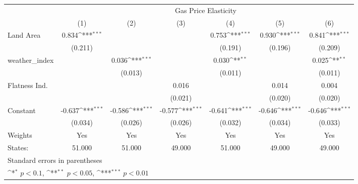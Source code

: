 {
\def\sym#1{\ifmmode^{#1}\else\(^{#1}\)\fi}
\begin{tabular}{l*{6}{c}}
\hline\hline
            &\multicolumn{6}{c}{Gas Price Elasticity}                                                                                           \\
            &\multicolumn{1}{c}{(1)}         &\multicolumn{1}{c}{(2)}         &\multicolumn{1}{c}{(3)}         &\multicolumn{1}{c}{(4)}         &\multicolumn{1}{c}{(5)}         &\multicolumn{1}{c}{(6)}         \\
\hline
Land Area   &       0.834\sym{***}&                     &                     &       0.753\sym{***}&       0.930\sym{***}&       0.841\sym{***}\\
            &     (0.211)         &                     &                     &     (0.191)         &     (0.196)         &     (0.209)         \\
[1em]
weather\_index&                     &       0.036\sym{***}&                     &       0.030\sym{**} &                     &       0.025\sym{**} \\
            &                     &     (0.013)         &                     &     (0.011)         &                     &     (0.011)         \\
[1em]
Flatness Ind.&                     &                     &       0.016         &                     &       0.014         &       0.004         \\
            &                     &                     &     (0.021)         &                     &     (0.020)         &     (0.020)         \\
[1em]
Constant    &      -0.637\sym{***}&      -0.586\sym{***}&      -0.577\sym{***}&      -0.641\sym{***}&      -0.646\sym{***}&      -0.646\sym{***}\\
            &     (0.034)         &     (0.026)         &     (0.026)         &     (0.032)         &     (0.034)         &     (0.033)         \\
\hline
Weights     &         Yes         &         Yes         &         Yes         &         Yes         &         Yes         &         Yes         \\
States:     &      51.000         &      51.000         &      49.000         &      51.000         &      49.000         &      49.000         \\
\hline\hline
\multicolumn{7}{l}{\footnotesize Standard errors in parentheses}\\
\multicolumn{7}{l}{\footnotesize \sym{*} \(p<0.1\), \sym{**} \(p<0.05\), \sym{***} \(p<0.01\)}\\
\end{tabular}
}
